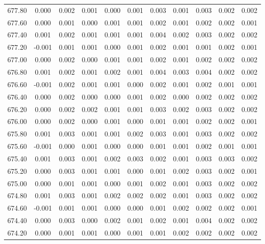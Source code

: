 \begin{longtable}{cccccccccc}
    677.80 &  0.000 &  0.002 &  0.001 &  0.000 &  0.001 &  0.003 &  0.001 &  0.003 &  0.002 &  0.002 \\
    677.60 &  0.000 &  0.001 &  0.000 &  0.001 &  0.001 &  0.002 &  0.001 &  0.002 &  0.002 &  0.001 \\
    677.40 &  0.001 &  0.002 &  0.001 &  0.001 &  0.001 &  0.004 &  0.002 &  0.003 &  0.002 &  0.002 \\
    677.20 & -0.001 &  0.001 &  0.001 &  0.000 &  0.001 &  0.002 &  0.001 &  0.001 &  0.002 &  0.001 \\
    677.00 &  0.000 &  0.002 &  0.000 &  0.001 &  0.001 &  0.002 &  0.001 &  0.002 &  0.002 &  0.002 \\
    676.80 &  0.001 &  0.002 &  0.001 &  0.002 &  0.001 &  0.004 &  0.003 &  0.004 &  0.002 &  0.002 \\
    676.60 & -0.001 &  0.002 &  0.001 &  0.001 &  0.000 &  0.002 &  0.001 &  0.002 &  0.001 &  0.001 \\
    676.40 &  0.000 &  0.002 &  0.000 &  0.000 &  0.001 &  0.002 &  0.000 &  0.002 &  0.002 &  0.002 \\
    676.20 &  0.000 &  0.002 &  0.002 &  0.001 &  0.001 &  0.003 &  0.002 &  0.003 &  0.002 &  0.002 \\
    676.00 &  0.000 &  0.002 &  0.000 &  0.001 &  0.000 &  0.001 &  0.001 &  0.002 &  0.002 &  0.001 \\
    675.80 &  0.001 &  0.003 &  0.001 &  0.001 &  0.002 &  0.003 &  0.001 &  0.003 &  0.002 &  0.002 \\
    675.60 & -0.001 &  0.000 &  0.001 &  0.000 &  0.000 &  0.001 &  0.001 &  0.002 &  0.001 &  0.001 \\
    675.40 &  0.001 &  0.003 &  0.001 &  0.002 &  0.003 &  0.002 &  0.001 &  0.003 &  0.003 &  0.002 \\
    675.20 &  0.000 &  0.003 &  0.001 &  0.001 &  0.000 &  0.001 &  0.002 &  0.003 &  0.002 &  0.001 \\
    675.00 &  0.000 &  0.001 &  0.001 &  0.000 &  0.001 &  0.002 &  0.001 &  0.003 &  0.002 &  0.002 \\
    674.80 &  0.001 &  0.003 &  0.001 &  0.002 &  0.002 &  0.002 &  0.001 &  0.003 &  0.002 &  0.002 \\
    674.60 & -0.001 &  0.001 &  0.001 &  0.000 &  0.000 &  0.001 &  0.002 &  0.002 &  0.002 &  0.001 \\
    674.40 &  0.000 &  0.003 &  0.000 &  0.002 &  0.001 &  0.002 &  0.001 &  0.004 &  0.002 &  0.002 \\
    674.20 &  0.000 &  0.001 &  0.001 &  0.000 &  0.001 &  0.001 &  0.002 &  0.002 &  0.002 &  0.002 \\

\end{longtable}
